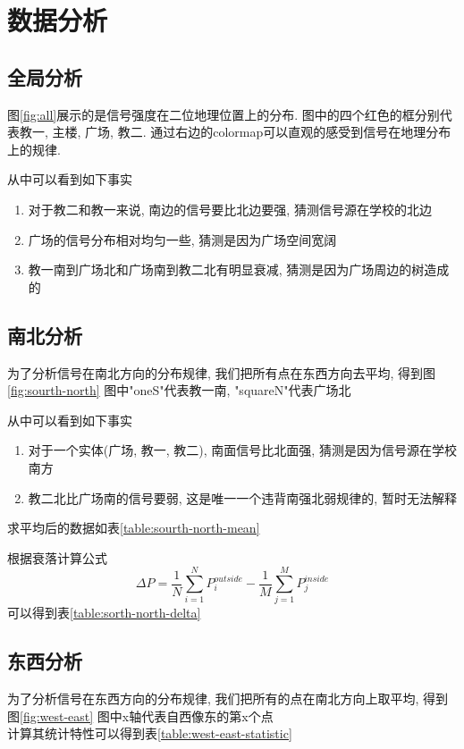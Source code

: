 
\section{数据分析}

 	\subsection{全局分析}
	图\ref{fig:all}展示的是信号强度在二位地理位置上的分布.
	图中的四个红色的框分别代表教一, 主楼, 广场, 教二.
	通过右边的colormap可以直观的感受到信号在地理分布上的规律.

 \indent	从中可以看到如下事实
	  \begin{enumerate}
		\item 对于教二和教一来说, 南边的信号要比北边要强, 猜测信号源在学校的北边
		\item 广场的信号分布相对均匀一些, 猜测是因为广场空间宽阔
		\item 教一南到广场北和广场南到教二北有明显衰减, 猜测是因为广场周边的树造成的
	  \end{enumerate}
	
 	\subsection{南北分析}
	为了分析信号在南北方向的分布规律, 我们把所有点在东西方向去平均, 得到图\ref{fig:sourth-north}
	图中"oneS"代表教一南, "squareN"代表广场北

 \indent	从中可以看到如下事实
		\begin{enumerate}
		  \item 对于一个实体(广场, 教一, 教二), 南面信号比北面强, 猜测是因为信号源在学校南方
		  \item	教二北比广场南的信号要弱, 这是唯一一个违背南强北弱规律的, 暂时无法解释
		\end{enumerate}

 \indent	求平均后的数据如表\ref{table:sourth-north-mean}
	

 \indent	根据衰落计算公式$$\Delta P = \frac{1}{N} \sum _{i=1} ^{N} P_i^{outside} -\frac{1}{M} \sum _{j=1} ^{M} P_j^{inside}$$可以得到表\ref{table:sorth-north-delta}
	

 	\subsection{东西分析}
	为了分析信号在东西方向的分布规律, 我们把所有的点在南北方向上取平均, 得到图\ref{fig:west-east}
	图中x轴代表自西像东的第x个点
\\\indent	计算其统计特性可以得到表\ref{table:west-east-statistic}
	
	

